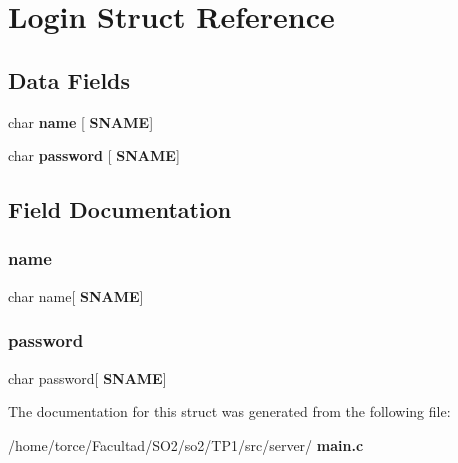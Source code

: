 \section{Login Struct Reference}
\label{struct_login}
\subsection*{Data Fields}
\begin{DoxyCompactItemize}
\item 
char \textbf{ name} [\textbf{ S\+N\+A\+ME}]
\item 
char \textbf{ password} [\textbf{ S\+N\+A\+ME}]
\end{DoxyCompactItemize}


\subsection{Field Documentation}
\mbox{\label{struct_login_a9e46adf32ce202b0f33097479dce0f74}} 
\subsubsection{name}
{\footnotesize\ttfamily char name[\textbf{ S\+N\+A\+ME}]}

\mbox{\label{struct_login_ac7b9e627171bb0d214aea70b4ca9d5c6}} 
\subsubsection{password}
{\footnotesize\ttfamily char password[\textbf{ S\+N\+A\+ME}]}



The documentation for this struct was generated from the following file\+:\begin{DoxyCompactItemize}
\item 
/home/torce/\+Facultad/\+S\+O2/so2/\+T\+P1/src/server/\textbf{ main.\+c}\end{DoxyCompactItemize}

